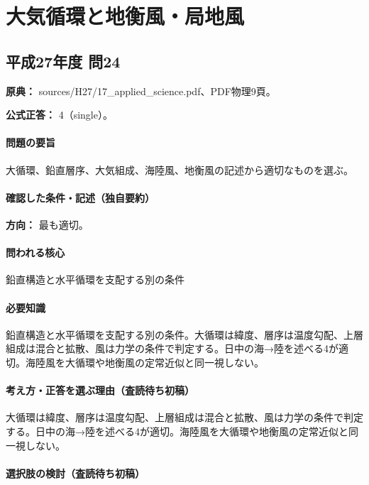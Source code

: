 \section{大気循環と地衡風・局地風}

\subsection{平成27年度 問24}
\label{q:h27-reg-applied-24}

\noindent\textbf{原典：} sources/H27/17\_applied\_science.pdf、PDF物理9頁。

\textbf{公式正答：} 4（single）。

\paragraph{問題の要旨} 大循環、鉛直層序、大気組成、海陸風、地衡風の記述から適切なものを選ぶ。

\paragraph{確認した条件・記述（独自要約）}\mbox{}\par

\noindent\textbf{方向：} 最も適切。\par

\paragraph{問われる核心} 鉛直構造と水平循環を支配する別の条件

\paragraph{必要知識} 鉛直構造と水平循環を支配する別の条件。大循環は緯度、層序は温度勾配、上層組成は混合と拡散、風は力学の条件で判定する。日中の海→陸を述べる4が適切。海陸風を大循環や地衡風の定常近似と同一視しない。

\paragraph{考え方・正答を選ぶ理由（査読待ち初稿）} 大循環は緯度、層序は温度勾配、上層組成は混合と拡散、風は力学の条件で判定する。日中の海→陸を述べる4が適切。海陸風を大循環や地衡風の定常近似と同一視しない。

\paragraph{選択肢の検討（査読待ち初稿）}\mbox{}\par

